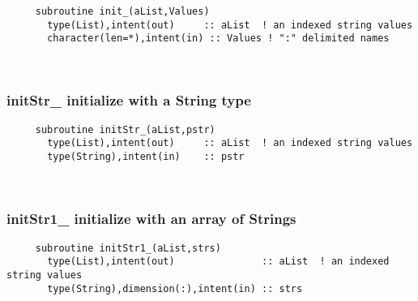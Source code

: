 \begin{verbatim} 
     subroutine init_(aList,Values)
       type(List),intent(out)	  :: aList  ! an indexed string values
       character(len=*),intent(in) :: Values ! ":" delimited names
 \end{verbatim} %
 
 
\mbox{}\hrulefill\ 
 
  \subsubsection{initStr\_ initialize with a String type}

\begin{verbatim} 
     subroutine initStr_(aList,pstr)
       type(List),intent(out)     :: aList  ! an indexed string values
       type(String),intent(in)	  :: pstr
 \end{verbatim} %
 
 
\mbox{}\hrulefill\ 
 
  \subsubsection{initStr1\_ initialize with an array of Strings}

\begin{verbatim} 
     subroutine initStr1_(aList,strs)
       type(List),intent(out)               :: aList  ! an indexed string values
       type(String),dimension(:),intent(in) :: strs
 \end{verbatim} %
 
 
